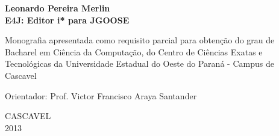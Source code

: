 

\fontsize{12}{12}
\begin{center}
\textbf{Leonardo Pereira Merlin}\\
\vspace{8cm}
\fontsize{14}{14}
\textbf{E4J: Editor i* para JGOOSE}\\
\vspace{2cm}
\end{center}
\fontsize{12}{12}

\begin{flushright}
\begin{minipage}[10cm] {8.5cm}
Monografia apresentada como requisito parcial para obten\c{c}\~{a}o do grau de Bacharel em Ci\^{e}ncia da Computa\c{c}\~{a}o, do Centro de Ci\^{e}ncias Exatas e Tecnol\'{o}gicas da Universidade Estadual do Oeste do Paran\'{a} - Campus de Cascavel

\vspace{1.5cm}
\noindent
Orientador: Prof. Victor Francisco Araya Santander
\end{minipage}
\end{flushright}

\vspace{5.5cm}
\begin{center}
CASCAVEL\\
2013
\end{center}

